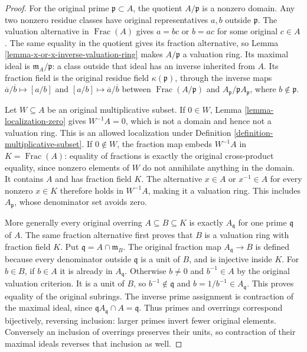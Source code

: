 \begin{proof}
For the original prime
$\mathfrak p\subset A$, the
quotient $A/\mathfrak p$ is
a nonzero domain. Any two
nonzero residue classes have
original representatives $a,b$
outside $\mathfrak p$.
The valuation alternative in
$\operatorname{Frac}(A)$ gives
$a=bc$ or $b=ac$ for
some original $c\in A$.
The same equality in the
quotient gives its fraction
alternative, so Lemma
\ref{lemma-x-or-x-inverse-valuation-ring}
makes $A/\mathfrak p$ a
valuation ring. Its maximal
ideal is $\mathfrak m_A/\mathfrak p$:
a class outside that ideal
has an inverse inherited
from $A$. Its fraction field
is the original residue
field $\kappa(\mathfrak p)$,
through the inverse maps
$\overline a/\overline b\mapsto[a/b]$
and $[a/b]\mapsto\overline a/\overline b$
between $\operatorname{Frac}(A/\mathfrak p)$
and $A_{\mathfrak p}/\mathfrak pA_{\mathfrak p}$,
where $b\notin\mathfrak p$.

Let $W\subseteq A$ be an
original multiplicative subset.
If $0\in W$, Lemma
\ref{lemma-localization-zero}
gives $W^{-1}A=0$, which
is not a domain and hence
not a valuation ring.
This is an allowed localization
under Definition
\ref{definition-multiplicative-subset}.
If $0\notin W$, the
fraction map embeds $W^{-1}A$
in $K=\operatorname{Frac}(A)$:
equality of fractions is
exactly the original cross-product
equality, since nonzero elements
of $W$ do not annihilate
anything in the domain.
It contains $A$ and has
fraction field $K$. The
alternative $x\in A$ or
$x^{-1}\in A$ for every
nonzero $x\in K$ therefore
holds in $W^{-1}A$, making
it a valuation ring. This
includes $A_{\mathfrak p}$,
whose denominator set avoids zero.

More generally every original
overring $A\subseteq B\subseteq K$
is exactly $A_{\mathfrak q}$
for one prime $\mathfrak q$
of $A$. The same fraction
alternative first proves that
$B$ is a valuation ring
with fraction field $K$.
Put $\mathfrak q=A\cap\mathfrak m_B$.
The original fraction map
$A_{\mathfrak q}\to B$ is
defined because every denominator
outside $\mathfrak q$ is
a unit of $B$, and is
injective inside $K$.
For $b\in B$, if $b\in A$
it is already in $A_{\mathfrak q}$.
Otherwise $b\neq0$ and
$b^{-1}\in A$ by the
original valuation criterion.
It is a unit of $B$,
so $b^{-1}\notin\mathfrak q$
and $b=1/b^{-1}\in A_{\mathfrak q}$.
This proves equality of the
original subrings. The inverse
prime assignment is contraction
of the maximal ideal, since
$\mathfrak qA_{\mathfrak q}\cap A=\mathfrak q$.
Thus primes and overrings
correspond bijectively, reversing
inclusion: larger primes invert
fewer original elements.
Conversely an inclusion of overrings
preserves their units, so contraction
of their maximal ideals reverses
that inclusion as well.


\end{proof}
